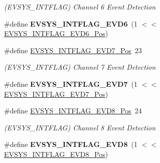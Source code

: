 \begin{DoxyCompactItemize}
\begin{DoxyCompactList}\small\item\em (E\+V\+S\+Y\+S\+\_\+\+I\+N\+T\+F\+L\+A\+G) Channel 6 Event Detection \end{DoxyCompactList}\item 
\hypertarget{group___s_a_m_l21___e_v_s_y_s_ga753d3e9cc7f522109943abac89d6790d}{}\#define {\bfseries E\+V\+S\+Y\+S\+\_\+\+I\+N\+T\+F\+L\+A\+G\+\_\+\+E\+V\+D6}~(1 $<$$<$ \hyperlink{group___s_a_m_l21___e_v_s_y_s_gaa3f1e6ade11523e9a2ae08c935ea568c}{E\+V\+S\+Y\+S\+\_\+\+I\+N\+T\+F\+L\+A\+G\+\_\+\+E\+V\+D6\+\_\+\+Pos})\label{group___s_a_m_l21___e_v_s_y_s_ga753d3e9cc7f522109943abac89d6790d}

\item 
\hypertarget{group___s_a_m_l21___e_v_s_y_s_ga4392f9923f60ac3c409014f5fe3c92f3}{}\#define \hyperlink{group___s_a_m_l21___e_v_s_y_s_ga4392f9923f60ac3c409014f5fe3c92f3}{E\+V\+S\+Y\+S\+\_\+\+I\+N\+T\+F\+L\+A\+G\+\_\+\+E\+V\+D7\+\_\+\+Pos}~23\label{group___s_a_m_l21___e_v_s_y_s_ga4392f9923f60ac3c409014f5fe3c92f3}

\begin{DoxyCompactList}\small\item\em (E\+V\+S\+Y\+S\+\_\+\+I\+N\+T\+F\+L\+A\+G) Channel 7 Event Detection \end{DoxyCompactList}\item 
\hypertarget{group___s_a_m_l21___e_v_s_y_s_ga632f31048fbcd79e68888fd97ba3a387}{}\#define {\bfseries E\+V\+S\+Y\+S\+\_\+\+I\+N\+T\+F\+L\+A\+G\+\_\+\+E\+V\+D7}~(1 $<$$<$ \hyperlink{group___s_a_m_l21___e_v_s_y_s_ga4392f9923f60ac3c409014f5fe3c92f3}{E\+V\+S\+Y\+S\+\_\+\+I\+N\+T\+F\+L\+A\+G\+\_\+\+E\+V\+D7\+\_\+\+Pos})\label{group___s_a_m_l21___e_v_s_y_s_ga632f31048fbcd79e68888fd97ba3a387}

\item 
\hypertarget{group___s_a_m_l21___e_v_s_y_s_ga5131a6151b285a9dcec2ef3a4b023543}{}\#define \hyperlink{group___s_a_m_l21___e_v_s_y_s_ga5131a6151b285a9dcec2ef3a4b023543}{E\+V\+S\+Y\+S\+\_\+\+I\+N\+T\+F\+L\+A\+G\+\_\+\+E\+V\+D8\+\_\+\+Pos}~24\label{group___s_a_m_l21___e_v_s_y_s_ga5131a6151b285a9dcec2ef3a4b023543}

\begin{DoxyCompactList}\small\item\em (E\+V\+S\+Y\+S\+\_\+\+I\+N\+T\+F\+L\+A\+G) Channel 8 Event Detection \end{DoxyCompactList}\item 
\hypertarget{group___s_a_m_l21___e_v_s_y_s_gaff5398a5e2438eea8784638d9589d2a2}{}\#define {\bfseries E\+V\+S\+Y\+S\+\_\+\+I\+N\+T\+F\+L\+A\+G\+\_\+\+E\+V\+D8}~(1 $<$$<$ \hyperlink{group___s_a_m_l21___e_v_s_y_s_ga5131a6151b285a9dcec2ef3a4b023543}{E\+V\+S\+Y\+S\+\_\+\+I\+N\+T\+F\+L\+A\+G\+\_\+\+E\+V\+D8\+\_\+\+Pos})\label{group___s_a_m_l21___e_v_s_y_s_gaff5398a5e2438eea8784638d9589d2a2}


\end{DoxyCompactItemize}
